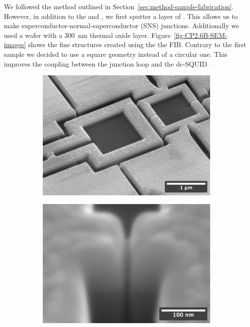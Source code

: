 We followed the method outlined in Section~\ref{sec:method-sample-fabrication}. However, in addition to the  and , we first sputter a layer of . This allows us to make superconductor-normal-superconductor (SNS) junctions. Additionally we used a  wafer with a \qty{300}{\nano\meter} thermal oxide layer. Figure~\ref{fig:CP2.6B-SEM-images} shows the fine structures created using the the FIB. Contrary to the first sample we decided to use a square geometry instead of a circular one. This improves the coupling between the junction loop and the dc-SQUID.

\begin{figure}[ht!]
	\begin{subfigure}[t]{0.3\textwidth}
		\centering
		\includegraphics[width=\textwidth]{figures/samples/CP2/CP2.6B_SEM_overview.jpg}
	\end{subfigure}
	\hfill
	\begin{subfigure}[t]{0.3\textwidth}
		\centering
		\includegraphics[width=\textwidth]{figures/samples/CP2/CP2.6B_SEM_junction.jpg}

\end{subfigure}
\end{figure}
